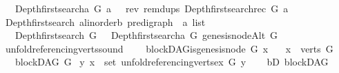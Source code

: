 \begin{isabellebody}
\ \ \ {\isachardoublequoteopen}Depth{\isacharunderscore}{\kern0pt}first{\isacharunderscore}{\kern0pt}search{\isacharunderscore}{\kern0pt}a\ G\ a\ {\isacharequal}{\kern0pt}\ \ rev\ {\isacharparenleft}{\kern0pt}remdups\ {\isacharparenleft}{\kern0pt}Depth{\isacharunderscore}{\kern0pt}first{\isacharunderscore}{\kern0pt}search{\isacharunderscore}{\kern0pt}rec\ G\ a{\isacharparenright}{\kern0pt}{\isacharparenright}{\kern0pt}{\isachardoublequoteclose}\isanewline
\isanewline
{}\isamarkupfalse%
\ Depth{\isacharunderscore}{\kern0pt}first{\isacharunderscore}{\kern0pt}search{\isacharcolon}{\kern0pt}{\isacharcolon}{\kern0pt}\ {\isachardoublequoteopen}{\isacharparenleft}{\kern0pt}{\isacharprime}{\kern0pt}a{\isacharcolon}{\kern0pt}{\isacharcolon}{\kern0pt}linorder{\isacharcomma}{\kern0pt}{\isacharprime}{\kern0pt}b{\isacharparenright}{\kern0pt}\ pre{\isacharunderscore}{\kern0pt}digraph\ {\isasymRightarrow}\ {\isacharprime}{\kern0pt}a\ list{\isachardoublequoteclose}\isanewline
\ \ \ {\isachardoublequoteopen}Depth{\isacharunderscore}{\kern0pt}first{\isacharunderscore}{\kern0pt}search\ G\ {\isacharequal}{\kern0pt}\ \ Depth{\isacharunderscore}{\kern0pt}first{\isacharunderscore}{\kern0pt}search{\isacharunderscore}{\kern0pt}a\ G\ {\isacharparenleft}{\kern0pt}genesis{\isacharunderscore}{\kern0pt}nodeAlt\ G{\isacharparenright}{\kern0pt}{\isachardoublequoteclose}\isanewline
\isanewline
{}\isamarkupfalse%
\ unfold{\isacharunderscore}{\kern0pt}referencing{\isacharunderscore}{\kern0pt}verts{\isacharunderscore}{\kern0pt}sound{\isacharcolon}{\kern0pt}\isanewline
\ \ \ {\isachardoublequoteopen}{\isasymnot}\ blockDAG{\isachardot}{\kern0pt}is{\isacharunderscore}{\kern0pt}genesis{\isacharunderscore}{\kern0pt}node\ G\ x{\isachardoublequoteclose}\isanewline
\ \ \ {\isachardoublequoteopen}x\ {\isasymin}\ verts\ G{\isachardoublequoteclose}\ \isanewline
\ \ \ {\isachardoublequoteopen}blockDAG\ G{\isachardoublequoteclose}\isanewline
{}\ {\isachardoublequoteopen}{\isasymexists}y{\isachardot}{\kern0pt}\ x\ {\isasymin}\ set\ {\isacharparenleft}{\kern0pt}unfold{\isacharunderscore}{\kern0pt}referencing{\isacharunderscore}{\kern0pt}verts{\isacharunderscore}{\kern0pt}ex\ G\ y{\isacharparenright}{\kern0pt}{\isachardoublequoteclose}\isanewline
%
\isadelimproof
%
\endisadelimproof
%
\isatagproof
{}\isamarkupfalse%
{\isacharminus}{\kern0pt}\isanewline
\ \ \isamarkupfalse%
\ bD{\isacharcolon}{\kern0pt}\ blockDAG\ \isamarkupfalse%

\end{isabellebody}

